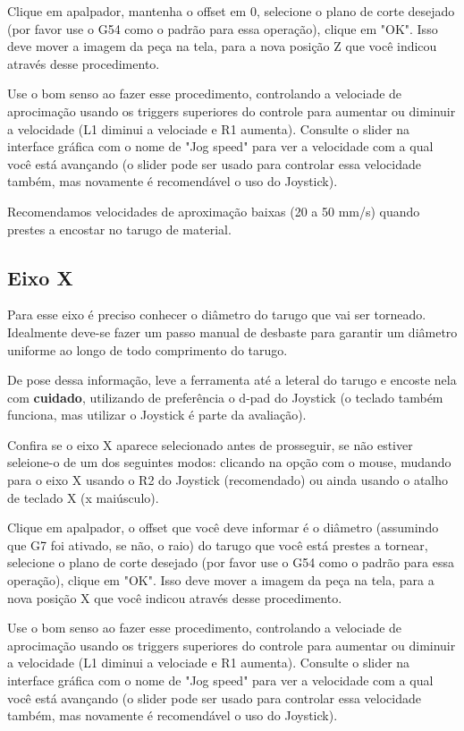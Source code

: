 \documentclass[twoside,a4paper]{refart}
\begin{document}
Clique em apalpador, mantenha o offset em 0, selecione o plano de corte desejado (por favor use o G54 como o padrão para essa operação), clique em "OK". Isso deve mover a imagem da peça na tela, para a nova posição Z que você indicou através desse procedimento.

\attention Use o bom senso ao fazer esse procedimento, controlando a velociade de aprocimação usando os triggers superiores do controle para aumentar ou diminuir a velocidade (L1 diminui a velociade e R1 aumenta). Consulte o slider na interface gráfica com o nome de "Jog speed" para ver a velocidade com a qual você está avançando (o slider pode ser usado para controlar essa velocidade também, mas novamente é recomendável o uso do Joystick). 

\attention Recomendamos velocidades de aproximação baixas (20 a 50 mm/s) quando prestes a encostar no tarugo de material.

\subsection{Eixo X}

Para esse eixo é preciso conhecer o diâmetro do tarugo que vai ser torneado. Idealmente deve-se fazer um passo manual de desbaste para garantir um diâmetro uniforme ao longo de todo comprimento do tarugo.

De pose dessa informação, leve a ferramenta até a leteral do tarugo e encoste nela com \textbf{cuidado}, utilizando de preferência o d-pad do Joystick (o teclado também funciona, mas utilizar o Joystick é parte da avaliação). 

Confira se o eixo X aparece selecionado antes de prosseguir, se não estiver seleione-o de um dos seguintes modos: clicando na opção com o mouse, mudando para o eixo X usando o R2 do Joystick (recomendado) ou ainda usando o atalho de teclado X (x maiúsculo).

Clique em apalpador, o offset que você deve informar é o diâmetro (assumindo que G7 foi ativado, se não, o raio) do tarugo que você está prestes a tornear, selecione o plano de corte desejado (por favor use o G54 como o padrão para essa operação), clique em "OK". Isso deve mover a imagem da peça na tela, para a nova posição X que você indicou através desse procedimento.

\attention Use o bom senso ao fazer esse procedimento, controlando a velociade de aprocimação usando os triggers superiores do controle para aumentar ou diminuir a velocidade (L1 diminui a velociade e R1 aumenta). Consulte o slider na interface gráfica com o nome de "Jog speed" para ver a velocidade com a qual você está avançando (o slider pode ser usado para controlar essa velocidade também, mas novamente é recomendável o uso do Joystick). 
\end{document}

